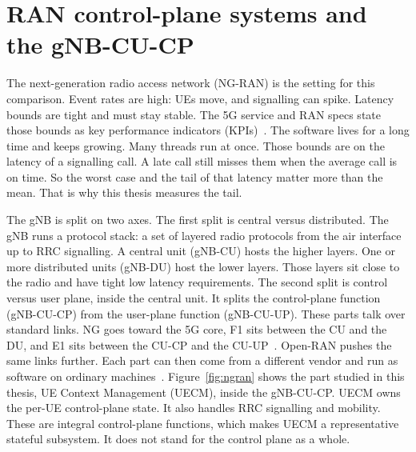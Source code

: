 \documentclass[english,oneside,a4paper,censored,csm,software-track-2020]{HYthesisML}
\begin{document}
\section{RAN control-plane systems and the gNB-CU-CP}\label{sec:ranarch}
The next-generation radio access network (NG-RAN) is the setting for this comparison.
Event rates are high: UEs move, and signalling can spike. Latency bounds are
tight and must stay stable. The 5G service and RAN specs state those bounds as key
performance indicators (KPIs)~\cite{3gpp38913,3gpp22261}. The software lives
for a long time and keeps growing. Many threads run at once. Those bounds are
on the latency of a signalling call. A late call still misses them when the
average call is on time. So the worst case and the tail of that latency matter
more than the mean. That is why this thesis measures the tail.

The gNB is split on two axes. The first split is central versus distributed.
The gNB runs a protocol stack: a set of layered radio protocols from the air
interface up to RRC signalling. A central unit (gNB-CU) hosts the higher layers.
One or more distributed units (gNB-DU) host the lower layers. Those layers sit close to
the radio and have tight low latency requirements. The second split is control versus user
plane, inside the central unit. It splits the control-plane function
(gNB-CU-CP) from the user-plane function (gNB-CU-UP). These parts talk over
standard links. NG goes toward the 5G core, F1 sits between the CU and the DU,
and E1 sits between the CU-CP and the CU-UP~\cite{3gpp38401,3gpp38300,3gpp38463}.
Open-RAN pushes the same links further. Each part can then come from a
different vendor and run as software on ordinary
machines~\cite{polese2023oran}. Figure~\ref{fig:ngran} shows the part studied in this thesis, UE Context Management (UECM), inside the gNB-CU-CP. UECM owns the per-UE
control-plane state. It also handles RRC signalling and mobility. These are
integral control-plane functions, which makes UECM a representative stateful
subsystem. It does not stand for the control plane as a whole.
\end{document}

